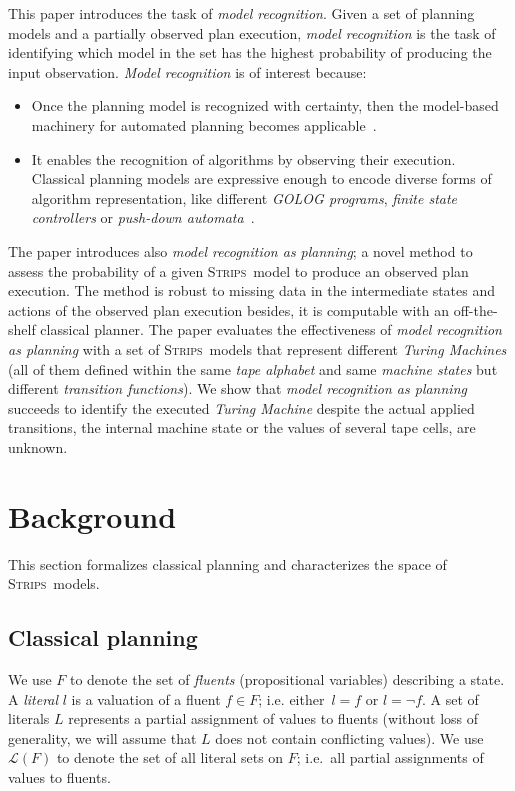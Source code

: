 \documentclass[letterpaper]{article} %
\newcommand{\strips}{\textsc{Strips}}     %
\begin{document}
This paper introduces the task of {\em model recognition}.  Given a set of planning models and a partially observed plan execution, {\em model recognition} is the task of identifying which model in the set has the highest probability of producing the input observation. {\em Model recognition} is of interest because:
\begin{itemize}
\item Once the planning model is recognized with certainty, then the model-based machinery for automated planning becomes applicable~\cite{ghallab2004automated}.
\item It enables the recognition of algorithms by observing their execution. Classical planning models are expressive enough to encode diverse forms of algorithm representation, like different {\em {\sc GOLOG} programs}, {\em finite state controllers} or {\em push-down automata}~\cite{baier2007exploiting,Geffner:FSM:AAAI10,segovia2017generating}.
\end{itemize}

The paper introduces also {\em model recognition as planning}; a novel method to assess the probability of a given \strips\ model to produce an observed plan execution. The method is robust to missing data in the intermediate states and actions of the observed plan execution besides, it is computable with an off-the-shelf classical planner. The paper evaluates the effectiveness of {\em model recognition as planning} with a set of \strips\ models that represent different {\em Turing Machines} (all of them defined within the same {\em tape alphabet} and same {\em machine states} but different {\em transition functions}). We show that {\em model recognition as planning} succeeds to identify the executed {\em Turing Machine} despite the actual applied transitions, the internal machine state or the values of several tape cells, are unknown.


\section{Background}
\label{sec:background}
This section formalizes classical planning and characterizes the space of \strips\ models.

\subsection{Classical planning}
We use $F$ to denote the set of {\em fluents} (propositional variables) describing a state. A {\em literal} $l$ is a valuation of a fluent $f\in F$; i.e. either~$l=f$ or $l=\neg f$. A set of literals $L$ represents a partial assignment of values to fluents (without loss of generality, we will assume that $L$ does not contain conflicting values). We use $\mathcal{L}(F)$ to denote the set of all literal sets on $F$; i.e.~all partial assignments of values to fluents.
\end{document}
